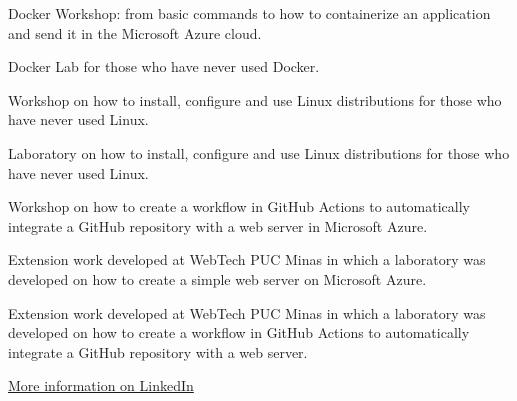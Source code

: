 
Docker Workshop: from basic commands to how to containerize an application and send it in the Microsoft Azure cloud.\\
\divider

Docker Lab for those who have never used Docker.\\
\divider

Workshop on how to install, configure and use Linux distributions for those who have never used Linux.\\
\divider

Laboratory on how to install, configure and use Linux distributions for those who have never used Linux.\\
\divider

Workshop on how to create a workflow in GitHub Actions to automatically integrate a GitHub repository with a web server in Microsoft Azure.\\
\divider

Extension work developed at WebTech PUC Minas in which a laboratory was developed on how to create a simple web server on Microsoft Azure.\\
\divider
        
Extension work developed at WebTech PUC Minas in which a laboratory was developed on how to create a workflow in GitHub Actions to automatically integrate a GitHub repository with a web server.\\
\divider

{\large\color{emphasis}\href{https://www.linkedin.com/in/henriquemcc/details/projects/}{More information on LinkedIn}}